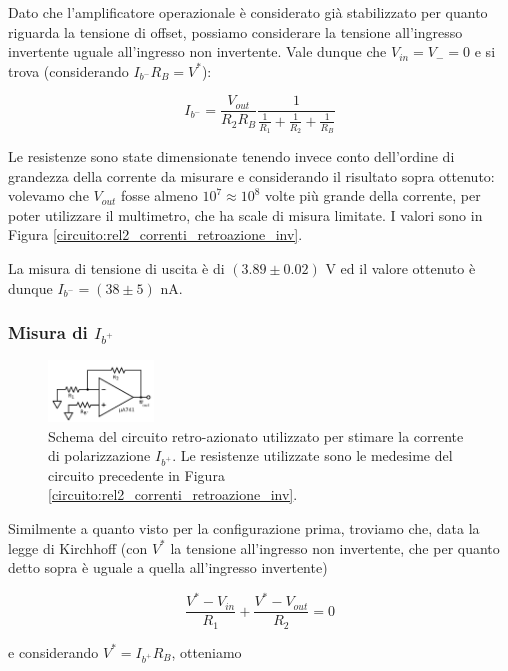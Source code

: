 Dato che l'amplificatore operazionale è considerato già stabilizzato per quanto riguarda la tensione di offset, possiamo considerare la tensione all'ingresso invertente uguale all'ingresso non invertente. Vale dunque che $V_{in}=V_{-}=0$ e si trova (considerando $I_{b^-} R_B = V^*$):

$$I_{b^-}=\frac{V_{out}}{R_2 R_B}\frac{1}{\frac{1}{R_1}+\frac{1}{R_2}+\frac{1}{R_B}}$$

Le resistenze sono state dimensionate tenendo invece conto dell'ordine di grandezza della corrente da misurare e considerando il risultato sopra ottenuto: volevamo che $V_{out}$ fosse almeno $10^7\approx10^8$ volte più grande della corrente, per poter utilizzare il multimetro, che ha scale di misura limitate. I valori sono in Figura \ref{circuito:rel2_correnti_retroazione_inv}.

La misura di tensione di uscita è di $(3.89\pm0.02)$ \si{\volt} ed il valore ottenuto è dunque $I_{b^-} = (38 \pm 5)$ \si{\nano\ampere}.

\subsubsection*{Misura di $I_{b^+}$}

\begin{figure}
  \begin{center}
    \includegraphics[width=0.25\textwidth]{../E02/latex/ninv_current.pdf}
  \end{center}
  \caption{Schema del circuito retro-azionato utilizzato per stimare la corrente di polarizzazione $I_{b^+}$. Le resistenze utilizzate sono le medesime del circuito precedente in Figura \ref{circuito:rel2_correnti_retroazione_inv}.}
  \label{circuito:rel2_correnti_retroazione_noninv}
\end{figure}

Similmente a quanto visto per la configurazione prima, troviamo che, data la legge di Kirchhoff (con $V^*$ la tensione all'ingresso non invertente, che per quanto detto sopra è uguale a quella all'ingresso invertente)

$$\frac{V^* - V_{in}}{R_1} + \frac{V^*-V_{out}}{R_2}=0$$

e considerando $V^*=I_{b^+} R_B$, otteniamo

